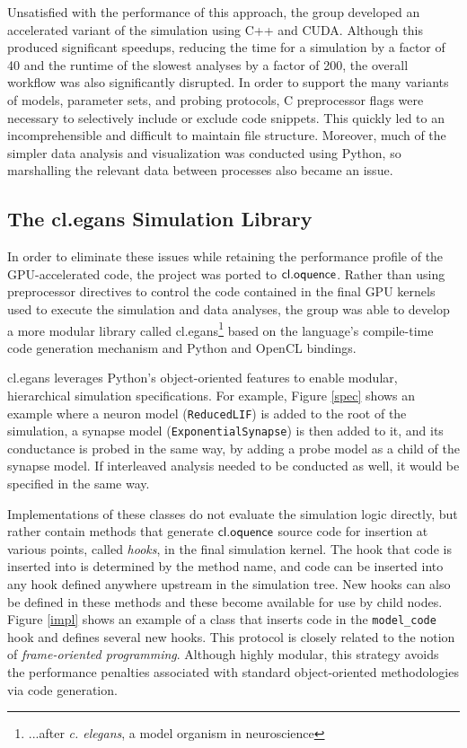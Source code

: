 \documentclass[10pt, conference, compsocconf]{IEEEtran}
\begin{document}
Unsatisfied with the performance of this approach, the group developed an accelerated variant of the simulation using C++ and CUDA. Although this produced significant speedups, reducing the time for a simulation by a factor of 40 and the runtime of the slowest analyses by a factor of 200, the overall workflow was also significantly disrupted. In order to support the many variants of models, parameter sets, and probing protocols, C preprocessor flags were necessary to selectively include or exclude code snippets. This quickly led to an incomprehensible and difficult to maintain file structure. Moreover, much of the simpler data analysis and visualization was conducted using Python, so marshalling the relevant data between processes also became an issue. 

\subsection{The {\sf cl.egans} Simulation Library}
In order to eliminate these issues while retaining the performance profile of the GPU-accelerated code, the project was ported to $\textsf{cl.oquence}$. Rather than using preprocessor directives to control the code contained in the final GPU kernels used to execute the simulation and data analyses, the group was able to develop a more modular  library called {\sf cl.egans}\footnote{...after {\it c. elegans}, a model organism in neuroscience} based on the language's compile-time code generation mechanism and Python and OpenCL bindings.

{\sf cl.egans} leverages Python's object-oriented features to enable modular, hierarchical simulation specifications. For example, Figure \ref{spec} shows an example where a neuron model (\verb|ReducedLIF|) is added to the root of the simulation, a synapse model (\verb|ExponentialSynapse|) is then added to it, and its conductance is probed in the same way, by adding a probe model as a child of the synapse model. If interleaved analysis needed to be conducted as well, it would be specified in the same way.

Implementations of these classes do not evaluate the simulation logic directly, but rather contain methods that generate $\textsf{cl.oquence}$ source code for insertion at various points, called {\it hooks}, in the final simulation kernel. The hook that code is inserted into is determined by the method name, and code can be inserted into any hook defined anywhere upstream in the simulation tree. New hooks can also be defined in these methods and these become available for use by child nodes. Figure \ref{impl} shows an example of a class that inserts code in the \verb|model_code| hook and defines several new hooks. This protocol is closely related to the notion of {\it frame-oriented programming}. Although highly modular, this strategy avoids the performance penalties associated with standard object-oriented methodologies via code generation.
\end{document}
